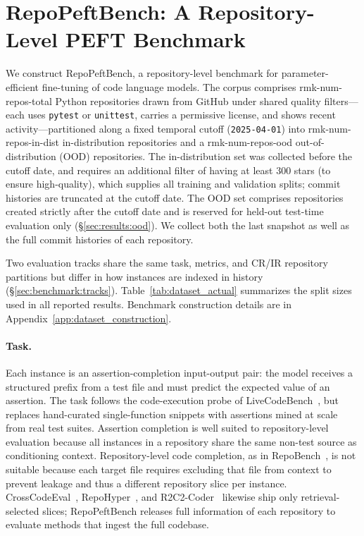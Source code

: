 \documentclass[11pt]{article}
\newcommand{\UseMacro}[1]{\csname rmk-#1\endcsname}
\newcommand{\repopeftbench}{RepoPeftBench\xspace}
\begin{document}
\section{\repopeftbench{}: A Repository-Level PEFT Benchmark}
\label{sec:benchmark}

We construct \repopeftbench{}, a repository-level benchmark for parameter-efficient fine-tuning of code language models.
The corpus comprises \UseMacro{num-repos-total} Python repositories drawn from GitHub under shared quality filters---each uses \texttt{pytest} or \texttt{unittest}, carries a permissive license, and shows recent activity---partitioned along a fixed temporal cutoff (\texttt{2025-04-01}) into \UseMacro{num-repos-in-dist} in-distribution repositories and a \UseMacro{num-repos-ood} out-of-distribution (OOD) repositories.
The in-distribution set was collected before the cutoff date, and requires an additional filter of having at least 300 stars (to ensure high-quality), which supplies all training and validation splits; commit histories are truncated at the cutoff date. %
The OOD set comprises repositories created strictly after the cutoff date and is reserved for held-out test-time evaluation only (\S\ref{sec:results:ood}).
We collect both the last snapshot as well as the full commit histories of each repository.

Two evaluation tracks share the same task, metrics, and CR/IR repository partitions but differ in how instances are indexed in history (\S\ref{sec:benchmark:tracks}).
Table~\ref{tab:dataset_actual} summarizes the split sizes used in all reported results.
Benchmark construction details are in Appendix~\ref{app:dataset_construction}.

\paragraph{Task.}
Each instance is an assertion-completion input-output pair: the model receives a structured prefix from a test file and must predict the expected value of an assertion.
The task follows the code-execution probe of LiveCodeBench~\cite{jain2025livecodebench}, but replaces hand-curated single-function snippets with assertions mined at scale from real test suites.
Assertion completion is well suited to repository-level evaluation because all instances in a repository share the same non-test source as conditioning context. %
Repository-level code completion, as in RepoBench~\cite{liu2023repobenchbenchmarkingrepositorylevelcode}, is not suitable because each target file requires excluding that file from context to prevent leakage and thus a different repository slice per instance.
CrossCodeEval~\cite{ding2024crosscodeeval}, RepoHyper~\cite{phan2024repohypersearchexpandrefinesemanticgraphs}, and R2C2-Coder~\cite{deng2024r2c2coder} likewise ship only retrieval-selected slices; \repopeftbench{} releases full information of each repository to evaluate methods that ingest the full codebase.
\end{document}
